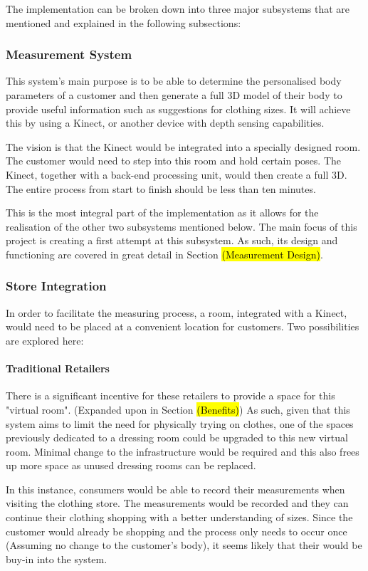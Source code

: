 The implementation can be broken down into three major subsystems that are mentioned and explained in the following subsections:

\subsubsection{Measurement System} \label{measureSystem}
This system's main purpose is to be able to determine the personalised body parameters of a customer and then generate a full 3D model of their body to provide useful information such as suggestions for clothing sizes. It will achieve this by using a Kinect, or another device with depth sensing capabilities. 

The vision is that the Kinect would be integrated into a specially designed room. The customer would need to step into this room and hold certain poses. The Kinect, together with a back-end processing unit, would then create a full 3D. The entire process from start to finish should be less than ten minutes. 

This is the most integral part of the implementation as it allows for the realisation of the other two subsystems mentioned below. The main focus of this project is creating a first attempt at this subsystem. As such, its design and functioning are covered in great detail in Section \hl{(Measurement Design)}. 

\subsubsection{Store Integration}
In order to facilitate the measuring process, a room, integrated with a Kinect, would need to be placed at a convenient location for customers. Two possibilities are explored here:

\paragraph{Traditional Retailers}
There is a significant incentive for these retailers to provide a space for this "virtual room". (Expanded upon in Section \hl{(Benefits)}) As such, given that this system aims to limit the need for physically trying on clothes, one of the spaces previously dedicated to a dressing room could be upgraded to this new virtual room. Minimal change to the infrastructure would be required and this also frees up more space as unused dressing rooms can be replaced. 

In this instance, consumers would be able to record their measurements when visiting the clothing store. The measurements would be recorded and they can continue their clothing shopping with a better understanding of sizes. Since the customer would already be shopping and the process only needs to occur once (Assuming no change to the customer's body), it seems likely that their would be buy-in into the system.


